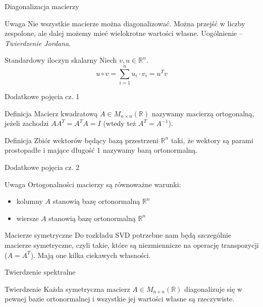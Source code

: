 \documentclass{beamer}
\begin{document}
\begin{frame}{Diagonalizacja macierzy}
\begin{alertblock}{Uwaga}
Nie wszystkie macierze można diagonalizować. Można przejść w liczby zespolone, ale dalej możemy mieć wielokrotne wartości własne. Uogólnienie -- \textit{Twierdzenie Jordana}.
\end{alertblock}
    
\end{frame}

\begin{frame}{Standardowy iloczyn skalarny}
Niech $v,u \in \mathbb{R}^n$. \\ 
$$u \circ v = \sum_{i=1}^n u_i \cdot v_i = u^Tv$$
\end{frame}

\begin{frame}{Dodatkowe pojęcia cz. 1}
\begin{block}{Definicja}
Macierz kwadratową $A \in M_{n \times n} (\mathbb{R}) $ nazywamy macierzą ortogonalną, jeżeli zachodzi $AA^T = A^TA = I$ (wtedy też $A^T = A^{-1}$).
\end{block}    

\begin{block}{Definicja}
Zbiór wektorów będący bazą przestrzeni $\mathbb{R}^n$ taki, że wektory są parami prostopadłe i mające długość $1$ nazywamy bazą ortonormalną.
\end{block}    
\end{frame}
\begin{frame}{Dodatkowe pojęcia cz. 2}
\begin{block}{Uwaga}
Ortogonalności macierzy są równoważne warunki:
\begin{itemize}
    \item kolumny $A$ stanowią bazę ortonormalną $\mathbb{R}^n$
    \item wiersze $A$ stanowią bazę ortonormalną $\mathbb{R}^n$
\end{itemize}
\end{block}
\end{frame}

\begin{frame}{Macierze symetryczne}
Do rozkładu SVD potrzebne nam będą szczególnie macierze symetryczne, czyli takie, które są niezmiennicze na operację transpozycji ($A=A^T$). Mają one kilka ciekawych własności.
\end{frame}

\begin{frame}{Twierdzenie spektralne}

\begin{block}{Twierdzenie}
Każda symetryczna macierz $A \in M_{n \times n} (\mathbb{R} )$ diagonalizuje się w pewnej bazie ortonormalnej  i wszystkie jej wartości własne są rzeczywiste.
\end{block}
    
\end{frame}
\end{document}
